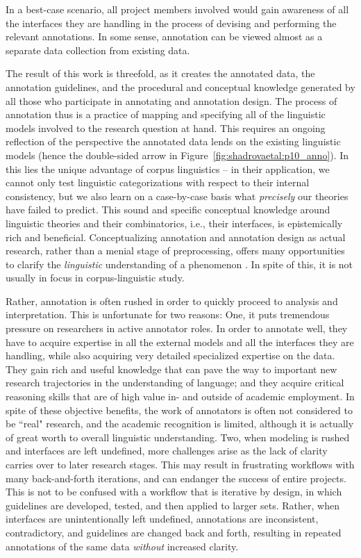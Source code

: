 \documentclass[output=paper,colorlinks,citecolor=brown]{langscibook}
\begin{document}
In a best-case scenario, all project members involved would gain awareness of all the interfaces they are handling in the process of devising and performing the relevant annotations. In some sense, annotation can be viewed almost as a separate data collection from existing data. 

The result of this work is threefold, as it creates the annotated data, the annotation guidelines, and the procedural and conceptual knowledge generated by all those who participate in annotating and annotation design. The process of annotation thus is a practice of mapping and specifying all of the linguistic models involved to the research question at hand. This requires an ongoing reflection of the perspective the annotated data lends on the existing linguistic models (hence the double-sided arrow in Figure~\ref{fig:shadrovaetal:p10_anno}). In this lies the unique advantage of corpus linguistics -- in their application, we cannot only test linguistic categorizations with respect to their internal consistency, but we also learn on a case-by-case basis what \textit{precisely} our theories have failed to predict. This sound and specific conceptual knowledge around linguistic theories and their combinatorics, i.e., their interfaces, is epistemically rich and beneficial. Conceptualizing annotation and annotation design as actual research, rather than a menial stage of preprocessing, offers many opportunities to clarify the \textit{linguistic} understanding of a phenomenon \parencite[see also][]{saftc}. In spite of this, it is not usually in focus in corpus-linguistic study. 

Rather, annotation is often rushed in order to quickly proceed to analysis and interpretation. This is unfortunate for two reasons: One, it puts tremendous pressure on researchers in active annotator roles. In order to annotate well, they have to acquire expertise in all the external models and all the interfaces they are handling, while also acquiring very detailed specialized expertise on the data. They gain rich and useful knowledge that can pave the way to important new research trajectories in the understanding of language; and they acquire critical reasoning skills that are of high value in- and outside of academic employment. In spite of these objective benefits, the work of annotators is often not considered to be ``real" research, and the academic recognition is limited, although it is actually of great worth to overall linguistic understanding. 
Two, when modeling is rushed and interfaces are left undefined, more challenges arise as the lack of clarity carries over to later research stages. This may result in frustrating workflows with many back-and-forth iterations, and can endanger the success of entire projects. This is not to be confused with a workflow that is iterative by design, in which guidelines are developed, tested, and then applied to larger sets. Rather, when interfaces are unintentionally left undefined, annotations are inconsistent, contradictory, and guidelines are changed back and forth, resulting in repeated annotations of the same data \textit{without} increased clarity.
\end{document}
